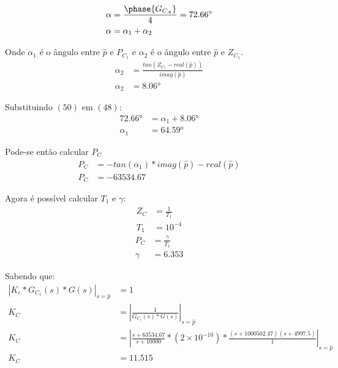 \documentclass[a4paper]{article}
\begin{document}
	\begin{align}
		\alpha &= \frac{\phase{G_{C_A}}}{4} = \ang{72.66}\\
		\alpha &= \alpha_1 + \alpha_2
	\end{align}
	\vspace{0.5em}
	\par Onde $\alpha_1$ é o ângulo entre ${\hat{p}}$ e $P_{C_1}$ e $\alpha_2$ é o ângulo entre ${\hat{p}}$ e ${Z_{C_1}}$.
	\vspace{0.5em}
	\begin{align}
		\alpha_2 &= \frac{tan({Z_{C_1}}-real({\hat{p}}))}{imag({\hat{p}})} \\
		\alpha_2 &= \ang{8.06}
	\end{align}
	
	\par Substituindo $(50)$ em $(48)$:
	\begin{align}
	\ang{72.66} &= \alpha_1 + \ang{8.06} \\
	\alpha_1 &= \ang{64.59}
	\end{align}
	\vspace{0.5em}
	
	\par Pode-se então calcular ${P_C}$
	\begin{align}
		P_C &= -tan(\alpha_1)*imag({\hat{p}})-real({\hat{p}}) \\
		P_C &= -63534.67
	\end{align}
 	\vspace{0.5em}
 	
 	\par Agora é possível calcular $T_1$ e $\gamma$:
 	\begin{align}
 	Z_C &=\frac{1}{T_1} \\
 	T_1 &= 10^{-4}
 	\end{align}
 	\vspace{0.5em}
 	\begin{align}
 	P_C &=\frac{\gamma}{T_1} \\
 	\gamma &= 6.353
 	\end{align}
 	
 	\vspace{0.5em}
 	\par Sabendo que:
 	\begin{align}
	|K_c*G_{C_1}(s)*G(s)|_{s=\hat{p}} &=1 \\
	K_C &= |\frac{1}{G_{C_1}(s)*G(s)}|_{s=\hat{p}} \\
	K_C &= |\frac{s+63534.67}{s+10000} *(2\times10^{-10})*\frac{(s+1000502.47)(s+4997.5)}{1} |_{s=\hat{p}} \\
	K_C &= 11.515
 	\end{align}
 	
\end{document}
